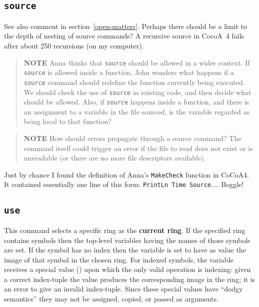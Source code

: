 \documentclass{book}[12,a4paper]
\def\mydots{$...$}
\begin{document}
\subsection{\texttt{source}}

See also comment in section~\ref{open-matters}.
Perhaps there should be a limit to the depth of nesting of source commands?
A recursive source in CocoA~4 fails after about 250 recursions (on my computer).

\begin{quote}
  {\bf NOTE} Anna thinks that \texttt{source} should be allowed in a wider
context.  If \texttt{source} is allowed inside a function, John wonders what
happens if a \texttt{source} command should redefine the function currently
being executed.  We should check the use of \texttt{source} in existing code,
and then decide what should be allowed.  Also, if \texttt{source} happens
inside a function, and there is an assignment to a variable in the file
sourced, is the variable regarded as being local to that function? 
\end{quote}

\begin{quote}
  \textbf{NOTE} How should errors propagate through a source command?
  The command itself could trigger an error if the file to read does not
  exist or is unreadable (or there are no more file descriptors available).
\end{quote}

Just by chance I found the definition of Anna's \texttt{MakeCheck} function in CoCoA4.
It contained essentially one line of this form: \texttt{PrintLn Time Source\mydots}.  Boggle!

\subsection{\texttt{use}}
\label{command:use}

This command selects a specific ring as the \textbf{current ring}.  If the
specified ring contains symbols then the top-level variables having the
names of those symbols are set.  If the symbol has no index then the
variable is set to have as value the image of that symbol in the chosen
ring.  For indexed symbols, the variable receives a special value () upon which the only valid operation is indexing: given a
correct index-tuple the value produces the corresponding image in the ring;
it is an error to give an invalid index-tuple.  Since these special values
have ``dodgy semantics'' they may not be assigned, copied, or passed as
arguments.
\end{document}
